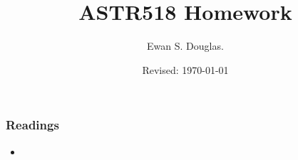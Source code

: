 \documentclass{beamer}
\title{ASTR518  Homework}
\author{Ewan S. Douglas. }
\date{Revised: \today}
\begin{document}
\frame{\titlepage}

\frame
{
\frametitle{Readings}
\begin{itemize}
\item 
\end{itemize}
}


\end{document}

